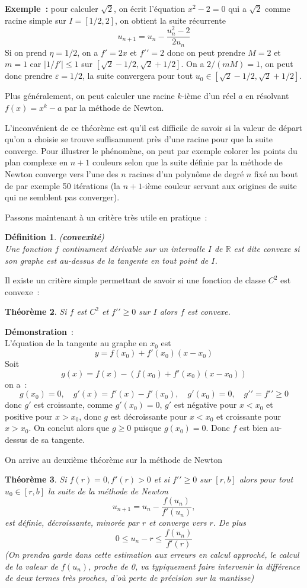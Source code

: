 \documentclass[a4paper,11pt]{article}
\newtheorem{thm}{Théorème}
\newtheorem{defn}[thm]{D\'efinition}
\begin{document}
\begin{giacjshere}
{\bf Exemple~:} pour calculer $\sqrt{2}$, on écrit l'équation $x^2-2=0$
qui a $\sqrt{2}$ comme racine simple sur $I=[1/2,2]$, 
on obtient la suite récurrente
\[ u_{n+1} = u_n - \frac{u_n^2-2}{2u_n} \]
Si on prend $\eta=1/2$, on a $f'=2x$ et $f'{'}=2$
donc on peut prendre $M=2$ et $m=1$ car $|1/f'|\leq 1$ sur 
$[\sqrt{2}-1/2,\sqrt{2}+1/2]$. On a $2/(mM)=1$, on peut donc 
prendre $\varepsilon=1/2$, la suite convergera pour tout 
$ u_0 \in [\sqrt{2}-1/2,\sqrt{2}+1/2]$.

Plus généralement, on peut calculer une racine $k$-ième d'un réel $a$
en résolvant $f(x)=x^k-a$ par la méthode de Newton.

L'inconvénient de ce th\'eor\`eme
est qu'il est difficile de savoir si la valeur de départ qu'on
a choisie se trouve suffisamment près d'une racine pour que
la suite converge. Pour illustrer le phénomène, 
on peut par exemple colorer les points du plan
complexe en $n+1$ couleurs selon que la suite définie par la méthode
de Newton converge vers l'une des $n$ racines d'un polynôme de degré
$n$ fixé au bout de par exemple 50 itérations (la $n+1$-ième couleur
servant aux origines de suite qui ne semblent pas converger).

Passons maintenant à un critère tr\`es utile en pratique~:
\begin{defn} ({\bf convexité})\\
Une fonction $f$ continument dérivable sur un intervalle $I$ de $\mathbb{R}$
est dite convexe si son graphe est au-dessus de la tangente en tout point
de $I$.
\end{defn}
Il existe un crit\`ere simple permettant de savoir si
une fonction de classe $C^2$ est convexe~:
\begin{thm}
Si $f$ est $C^2$ et $f'{'} \geq 0$ sur $I$ alors $f$ est convexe.
\end{thm}
{\bf Démonstration}~:\\
L'équation de la tangente au graphe en $x_0$ est 
\[ y=f(x_0)+f'(x_0)(x-x_0) \]
Soit
\[ g(x)=f(x)-(f(x_0)+f'(x_0)(x-x_0)) \]
on a~:
\[ g(x_0)=0, \quad g'(x)=f'(x)-f'(x_0), \quad g'(x_0)=0, 
\quad g'{'}=f'{'} \geq 0 \]
donc $g'$ est croissante, comme $g'(x_0)=0$, $g'$ est négative
pour $x<x_0$ et positive pour $x>x_0$, donc $g$ est décroissante
pour $x<x_0$ et croissante pour $x>x_0$. On conclut alors que
$g \geq 0$ puisque $g(x_0)=0$. Donc $f$ est bien au-dessus
de sa tangente.

On arrive au deuxième théorème sur la méthode de Newton
\begin{thm} 
Si $f(r)=0, f'(r)>0$ et si $f'{'} \geq 0$ sur $[r,b]$ alors
pour tout $u_0 \in [r,b]$ la suite de la méthode de Newton
\[ u_{n+1} = u_n -\frac{f(u_n)}{f'(u_n)},  \]
est définie, décroissante, minorée par $r$ et converge vers 
$r$. De plus
\[ 0 \leq u_n -r \leq \frac{f(u_n)}{f'(r)} \]
(On prendra garde dans cette estimation aux erreurs en calcul
approch\'e, le calcul de la valeur de $f(u_n)$, proche de 0, va typiquement
faire intervenir la diff\'erence de deux termes tr\`es proches,
d'o\`u perte de pr\'ecision sur la mantisse)
\end{thm}


\end{giacjshere}
\end{document}
